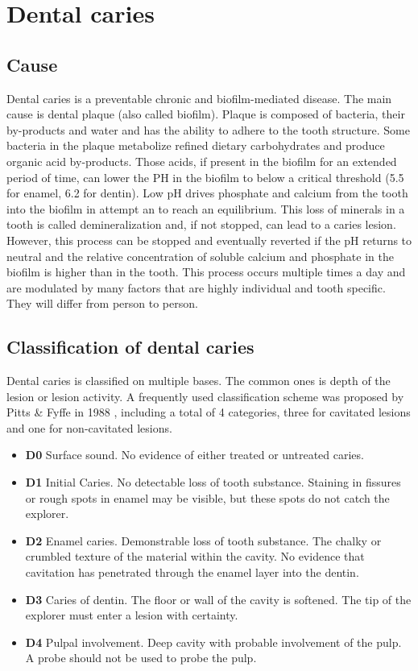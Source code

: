 \section{Dental caries}

\subsection{Cause}
Dental caries is a preventable chronic and biofilm-mediated disease. The main cause is dental plaque (also called biofilm). Plaque is composed of bacteria, their by-products and water and has the ability to adhere to the tooth structure. Some bacteria in the plaque metabolize refined dietary carbohydrates and produce organic acid by-products. Those acids, if present in the biofilm for an extended period of time, can lower the PH in the biofilm to below a critical threshold (5.5 for enamel, 6.2 for dentin)\cite{2019a}. Low pH drives phosphate and calcium from the tooth into the biofilm in attempt an to reach an equilibrium. This loss of minerals in a tooth is called demineralization and, if not stopped, can lead to a caries lesion. However, this process can be stopped and eventually reverted if the pH returns to neutral and the relative concentration of soluble calcium and phosphate in the biofilm is higher than in the tooth. This process occurs multiple times a day and are modulated by many factors that are highly individual and tooth specific. They will differ from person to person.


\subsection{Classification of dental caries}
Dental caries is classified on multiple bases. The common ones is depth of the lesion or lesion activity. \newline
A frequently used classification scheme was proposed by Pitts \& Fyffe in 1988 \cite{2019a}, including a total of 4 categories, three for cavitated lesions and one for non-cavitated lesions.
\begin{itemize}
    \item \textbf{D0} Surface sound. No evidence of either treated or untreated caries.
    \item \textbf{D1} Initial Caries. No detectable loss of tooth substance. Staining in fissures or rough spots in enamel may be visible, but these spots do not catch the explorer.
    \item \textbf{D2} Enamel caries. Demonstrable loss of tooth substance. The chalky or crumbled texture of the material within the cavity. No evidence that cavitation has penetrated through the enamel layer into the dentin.
    \item \textbf{D3} Caries of dentin. The floor or wall of the cavity is softened. The tip of the explorer must enter a lesion with certainty.
    \item \textbf{D4} Pulpal involvement. Deep cavity with probable involvement of the pulp. A probe should not be used to probe the pulp.
\end{itemize}

